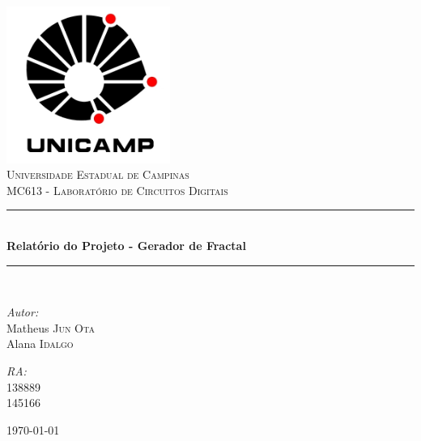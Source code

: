 \documentclass[a4paper, 12pt]{article}
\begin{document}
\begin{titlepage}
\begin{center}

\includegraphics[width=0.4\textwidth]{./logo.jpg}~\\[2cm]

\textsc{\LARGE Universidade Estadual de Campinas}\\[1.5cm]
\textsc{\Large MC613 - Laboratório de Circuitos Digitais}\\[0.5cm]

\rule{\linewidth}{0.5mm} \\[0.4cm]
{ \huge \bfseries Relatório do Projeto - Gerador de Fractal \\[0.4cm] }

\rule{\linewidth}{0.5mm} \\[1.5cm]


\noindent
\begin{minipage}{0.4\textwidth}
\begin{flushleft} \large
\emph{Autor:}\\
Matheus  \textsc{Jun Ota} \\
Alana  \textsc{Idalgo}
\end{flushleft}
\end{minipage}%
\begin{minipage}{0.4\textwidth}
\begin{flushright} \large
\emph{RA:} \\
138889\\
145166
\end{flushright}
\end{minipage}


\vfill

{\large \today}

\end{center}
\end{titlepage}
\end{document}
